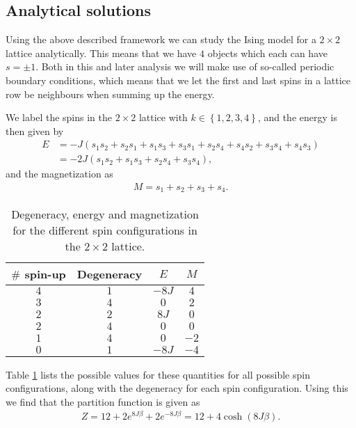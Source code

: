 \documentclass[12pt, a4paper]{article}
\begin{document}
\subsection{Analytical solutions}

Using the above described framework we can study the Ising model for a $2\times 2$ lattice analytically. 
This means that we have $4$ objects which each can have $s=\pm 1$. Both in this and later analysis we 
will make use of so-called periodic boundary conditions, which means that we let the first and last 
spins in a lattice row be neighbours when summing up the energy. 

We label the spins in the $2\times 2$ lattice with $k \in \left\lbrace 1,2,3,4\right\rbrace$, and the 
energy is then given by 
\begin{align*}
E & = -J(s_1 s_2 + s_2 s_1 + s_1 s_3 + s_3 s_1 +s_2 s_4 +s_4 s_2 + s_3 s_4 + s_4 s_3) \\
  & = -2J(s_1 s_2 + s_1 s_3 + s_2 s_4 + s_3 s_4),  	
\end{align*}  
and the magnetization as 
\begin{align*}
M = s_1 + s_2 + s_3 + s_4. 
\end{align*}

\begin{table}[ht!]
\caption{Degeneracy, energy and magnetization for the different spin configurations in the $2\times 2$
lattice.}
\label{tab:2times2}
\begin{center}
\begin{tabular}{cccc} \hline\hline
$\#$ spin-up & Degeneracy & $E$ & $M$ \\ \hline
$4$ & $1$ & $-8J$ & $4$ \\ 
$3$ & $4$ & $0$ & $2$ \\
$2$ & $2$ & $8J$ & $0$ \\  
$2$ & $4$ & $0$ & $0$ \\ 
$1$ & $4$ & $0$ & $-2$ \\ 
$0$ & $1$ & $-8J$ & $-4$ \\ \hline
\end{tabular}
\end{center}
\end{table}

Table \ref{tab:2times2} lists the possible values for these quantities for all possible spin 
configurations, along with the degeneracy for each spin configuration. Using this we find that the 
partition function is given as 
\begin{align*}
Z = 12 + 2e^{8J\beta} + 2e^{-8J\beta} = 12 + 4 \cosh(8J\beta). 
\end{align*} 
\end{document}
